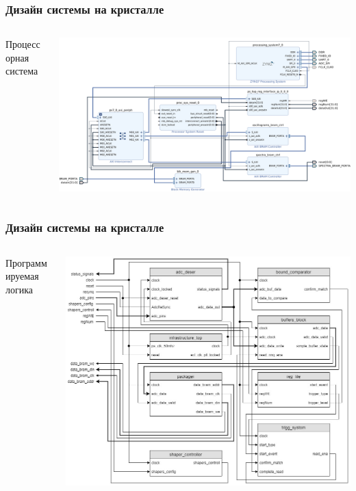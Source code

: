 \documentclass[aspectratio=169]{beamer}
\begin{document}
\begin{frame}
\frametitle{Дизайн системы на кристалле}
    \begin{columns}
        \begin{column}{0.2\textwidth}
        Процессорная система
        \end{column}
        \begin{column}{0.8\textwidth}
            \includegraphics[width=\textwidth]{ps_top.jpg}
        \end{column}
    \end{columns}
\end{frame}

\begin{frame}
\frametitle{Дизайн системы на кристалле}
    \begin{columns}
        \begin{column}{0.4\textwidth}
        Программируемая логика
        \end{column}
        \begin{column}{0.6\textwidth}
            \includegraphics[width=\textwidth]{pl_top.jpg}
        \end{column}
    \end{columns}
\end{frame}
\end{document}
